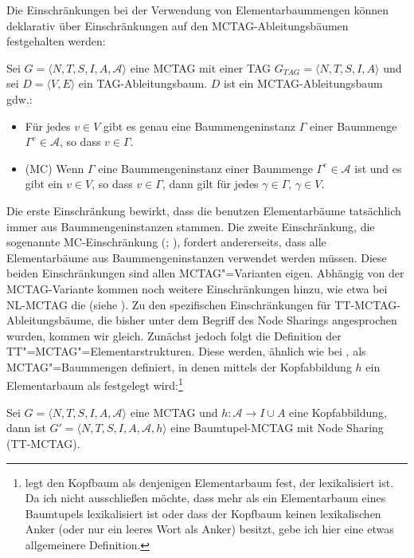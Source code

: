 Die Einschränkungen bei der Verwendung von Elementarbaummengen können deklarativ über Einschränkungen auf den MCTAG-Ableitungsbäumen festgehalten werden:  
\begin{definition}
Sei $G = \langle N,T,S,I,A,\mathcal{A} \rangle$ eine MCTAG mit einer TAG $G_{TAG} = \langle N,T,S,I,A\rangle$ und sei $D = \langle V,E \rangle$ ein  TAG-Ableitungsbaum. $D$ ist ein MCTAG-Ableitungsbaum gdw.:
\begin{itemize}
  \item Für jedes $v \in V$ gibt es genau eine Baummengeninstanz $\Gamma$ einer Baummenge $\Gamma^e \in \mathcal{A}$, so dass $v \in \Gamma$.
  \item (MC) Wenn $\Gamma$ eine Baummengeninstanz einer Baummenge $\Gamma^e \in \mathcal{A}$ ist und es gibt ein $v \in V$, so dass $v \in \Gamma$, dann gilt für jedes $\gamma \in \Gamma$, $\gamma \in V$.
\end{itemize}
\end{definition}
Die erste Einschränkung bewirkt, dass die benutzen Elementarbäume tatsächlich immer aus Baummengeninstanzen stammen. Die zweite Einschränkung, die sogenannte MC-Einschrän\-kung (\citealt[197]{Kallmeyer:05}; \citealt[64]{Kallmeyer:09}), fordert andererseits, dass alle Elementarbäume aus Baummengeninstanzen verwendet werden müssen. Diese beiden Einschränkungen sind allen MCTAG"=Varianten eigen. Abhängig von der MCTAG-Variante kommen noch weitere Einschränkungen hinzu, wie etwa bei NL-MCTAG die  (siehe \citealt[66]{Kallmeyer:09}). Zu den spezifischen Einschränkungen für TT-MCTAG-Ableitungs\-bäume, die bisher unter dem Begriff des Node Sharings angesprochen wurden, kommen wir gleich. Zunächst jedoch folgt die Definition der TT"=MCTAG"=Elementarstrukturen. Diese werden, ähnlich wie bei \citet[71]{Kallmeyer:09}, als MCTAG"=Baummengen definiert, in denen mittels der Kopfabbildung $h$ ein Elementarbaum als  festgelegt wird:\footnote{\citet[71]{Kallmeyer:09} legt den Kopfbaum als denjenigen Elementarbaum fest, der lexikalisiert ist. Da ich nicht ausschlie\ss en möchte, dass mehr als ein Elementarbaum eines Baumtupels lexikalisiert ist oder dass der Kopfbaum keinen lexikalischen Anker (oder nur ein leeres Wort als Anker) besitzt, gebe ich hier eine etwas allgemeinere Definition.}
\begin{definition}[TT-MCTAG]
Sei $G = \langle N,T,S,I,A,\mathcal{A} \rangle$ eine MCTAG und $h: \mathcal{A} \to I\cup A$ eine Kopfabbildung, dann ist $G'= \langle N,T,S,I,A,\mathcal{A},h \rangle$ eine Baumtupel-MCTAG mit Node Sharing (TT-MCTAG). 
\end{definition}

